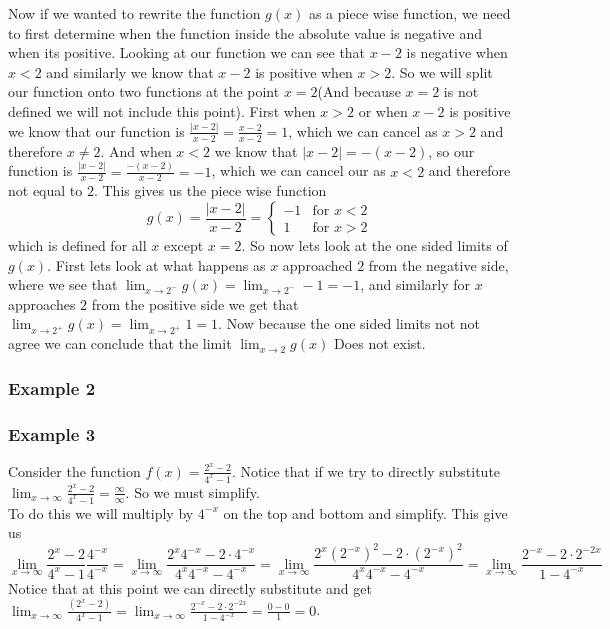 \documentclass[12pt]{article}
\begin{document}
Now if we wanted to rewrite the function $g(x)$ as a piece wise function, we need to first determine when the function inside the absolute value is negative and when its positive. Looking at our function we can see that $x-2$ is negative when $x<2$ and similarly we know that $x-2$ is positive when $x>2$. So we will split our function onto two functions at the point $x=2$(And because $x=2$ is not defined we will not include this point). First when $x> 2$ or when $x-2$ is positive we know that our function is $\frac{|x-2|}{x-2}=\frac{x-2}{x-2}=1$, which we can cancel as $x>2$ and therefore $x\neq 2$. And when $x<2$ we know that $|x-2|= -(x-2)$, so our function is $\frac{|x-2|}{x-2}=\frac{-(x-2)}{x-2}=-1$, which we can cancel our as $x<2$ and therefore not equal to $2$. This gives us the piece wise function 
$$g(x)=\frac{|x-2|}{x-2}=\begin{cases}
        -1 & \text{for } x < 2\\
        1 & \text{for } x > 2  
    \end{cases}$$
which is defined for all $x$ except $x=2$. So now lets look at the one sided limits of $g(x)$. First lets look at what happens as $x$ approached $2$ from the negative side, where we see that $\displaystyle{\lim_{x\to 2^{-}}g(x)}=\displaystyle{\lim_{x\to 2^{-}}-1}=-1$, and similarly for $x$ approaches $2$ from the positive side we get that $\displaystyle{\lim_{x\to 2^{+}}g(x)}=\displaystyle{\lim_{x\to 2^{+}}1}=1$. Now because the one sided limits not not agree we can conclude that the limit $\displaystyle{\lim_{x\to 2}g(x)}$ Does not exist.

\subsubsection{Example 2}
\label{ex:exp}


\subsubsection{Example 3}
\label{ex:exp2}

Consider the function $f(x)=\frac{2^{x}-2}{4^{x}-1}$. Notice that if we try to directly substitute $\displaystyle{\lim_{x\to\infty}\frac{2^{x}-2}{4^{x}-1}}=\frac{\infty}{\infty}$. So we must simplify.\\

To do this we will multiply by $4^{-x}$ on the top and bottom and simplify. This give us
$$\displaystyle{\lim_{x\to\infty}\frac{2^{x}-2}{4^{x}-1}}\frac{4^{-x}}{4^{-x}}=\lim_{x\to\infty}\frac{2^{x}4^{-x}-2\cdot4^{-x}}{4^{x}4^{-x}-4^{-x}}=\lim_{x\to\infty}\frac{2^{x}\left(2^{-x}\right)^{2}-2\cdot\left(2^{-x}\right)^{2}}{4^{x}4^{-x}-4^{-x}}=\lim_{x\to\infty}\frac{2^{-x}-2\cdot2^{-2x}}{1-4^{-x}}$$
Notice that at this point we can directly substitute and get
$\displaystyle{\lim_{x\to\infty}\frac{\left(2^{x}-2\right)}{4^{x}-1}}=\lim_{x\to\infty}\frac{2^{-x}-2\cdot2^{-2x}}{1-4^{-x}}=\frac{0-0}{1}=0$.\\
\end{document}
